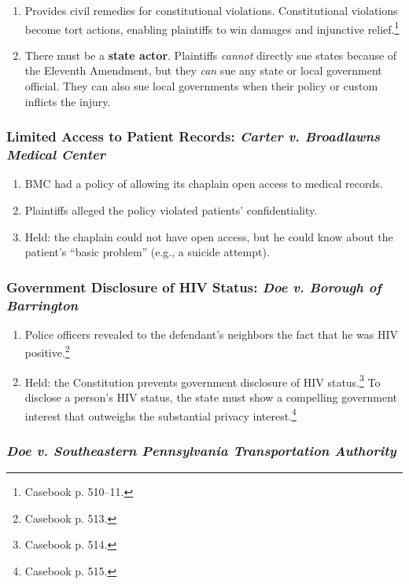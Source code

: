 \begin{enumerate}
    \item Provides civil remedies for constitutional violations. Constitutional 
    violations become tort actions, enabling plaintiffs to win damages and 
    injunctive relief.\footnote{Casebook p. 510--11.}
    \item There must be a \textbf{state actor}. Plaintiffs \emph{cannot} 
    directly sue states because of the Eleventh Amendment, but they \emph{can} 
    sue any state or local government official. They can also sue local 
    governments when their policy or custom inflicts the injury.
\end{enumerate}

\subsubsection{Limited Access to Patient Records: \emph{Carter v. Broadlawns 
Medical Center}}

\begin{enumerate}
    \item BMC had a policy of allowing its chaplain open access to medical 
    records.
    \item Plaintiffs alleged the policy violated patients' confidentiality.
    \item Held: the chaplain could not have open access, but he could know about 
    the patient's ``basic problem'' (e.g., a suicide attempt).
\end{enumerate}

\subsubsection{Government Disclosure of HIV Status: \emph{Doe v. Borough of 
Barrington}}

\begin{enumerate}
    \item Police officers revealed to the defendant's neighbors the fact that he 
    was HIV positive.\footnote{Casebook p. 513.}
    \item Held: the Constitution prevents government disclosure of HIV 
    status.\footnote{Casebook p. 514.} To disclose a person's HIV status, the 
    state must show a compelling government interest that outweighs the 
    substantial privacy interest.\footnote{Casebook p. 515.}
\end{enumerate}

\subsubsection{\emph{Doe v. Southeastern Pennsylvania Transportation Authority}}

